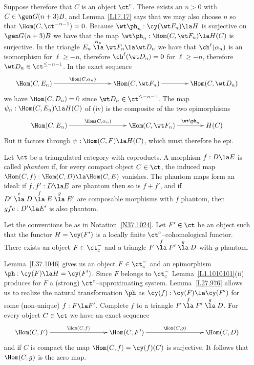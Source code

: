 \documentclass[11pt]{amsart}
\begin{document}
Suppose therefore that $C$ is an object $\ct^c$. There exists
an $n>0$ with $C\in\gen G{(n+3)B}$, and Lemma~\ref{L17.17} says that we may
also choose $n$ so that $\Hom(C,\ct^{-n-1})=0$. Because
$\wt\ph_n:\cy(\wt F_n)\la H$ is surjective on
$\gen G{(n+3)B}$ we have that the map
$\wt\ph_n:\Hom(C,\wt F_n)\la H(C)$ is surjective.
In the triangle $E_n\stackrel{\alpha_n}\la \wt F_n\la \wt D_n$ we have
that $\ch^\ell(\alpha_n)$ is an isomorphism for $\ell\geq-n$, therefore
$\ch^\ell(\wt D_n)=0$ for $\ell\geq-n$, therefore $\wt D_n\in\ct^{\leq-n-1}$. 
In the exact sequence
\[\xymatrix@C+15pt{
\Hom(C,E_n)\ar[rr]^-{\Hom(C,\alpha_n)}& &\Hom(C,\wt F_n)\ar[r] &               
\Hom(C,\wt D_n)
}\]
we have $\Hom(C,D_n)=0$ since $\wt D_n\in\ct^{\leq-n-1}$. The
map $\psi_n:\Hom(C,E_n)\la H(C)$ of (iv) is the composite of the
two epimorphisms
\[\xymatrix@C+15pt{
  \Hom(C,E_n)\ar[rr]^-{\Hom(C,\alpha_n)}&&
  \Hom(C,\wt F_n)\ar[r]^-{\wt\ph_n} &          
H(C)
}\]
But it factors through $\psi:\Hom(C,F)\la H(C)$, which must
therefore be epi.
\eprf

Let $\ct$ be a triangulated category with coproducts.
A morphism $f:D\la E$ is called
\emph{phantom} if, for every compact object $C\in\ct$, the induced map
$\Hom(C,f):\Hom(C,D)\la\Hom(C,E)$ vanishes. The phantom maps
form an ideal: if $f,f':D\la E$ are phantom then so is $f+f'$, and if
$D'\stackrel e\la D\stackrel f\la E\stackrel g\la E'$ are composable
morphisms with $f$ phantom, then $gfe:D'\la E'$ is also
phantom.
\ermd

Let the conventions be as in Notation~\ref{N37.1024}.
Let 
$F'\in\ct$ be an object
such that the functor $H=\cy(F')$
is a locally finite $\ct^c$--cohomological functor.
There exists an object $F\in\ct^-_c$ and a triangle
$F\stackrel f\la F'\stackrel g\la D$ with
$g$ phantom.
\ecor

\prf
Lemma~\ref{L37.1046} gives us an object $F\in\ct^-_c$ and an
epimorphism $\ph:\cy(F)\la H=\cy(F')$.
Since $F$ belongs to $\ct^-_c$ Lemma~\ref{L1.1010101}(ii) produces
for $F$ a (strong) $\ct^c$--approximating system. Lemma~\ref{L27.976}
allows us to realize the natural transformation
$\ph$ as $\cy(f):\cy(F)\la \cy(F')$
for some (non-unique) $f:F\la F'$. Complete $f$ to a triangle
$F\stackrel f\la F'\stackrel g\la D$.
For every object
$C\in\ct$ we have an exact sequence
\[\xymatrix@C+15pt{
  \Hom(C,F)\ar[rr]^-{\Hom(C,f)}&&
  \Hom(C,F')\ar[rr]^-{\Hom(C,g)} &&          
\Hom(C,D)
}\]
and if $C$ is compact the map $\Hom(C,f)=\cy(f)(C)$ is surjective. It follows
that $\Hom(C,g)$ is the zero map.
\eprf
\end{document}
